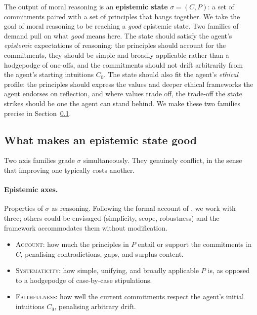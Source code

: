 \documentclass{article}
\begin{document}
The output of moral reasoning is an \textbf{epistemic state}
$\sigma = (C, P)$: a set of commitments paired with a set of principles
that hangs together. We take the goal of moral reasoning to be reaching a
\emph{good} epistemic state. Two families of demand pull on what
\emph{good} means here. The state should satisfy the agent's
\emph{epistemic} expectations of reasoning: the principles should account
for the commitments, they should be simple and broadly applicable rather
than a hodgepodge of one-offs, and the commitments should not drift
arbitrarily from the agent's starting intuitions $C_0$. The state should
also fit the agent's \emph{ethical} profile: the principles should express
the values and deeper ethical frameworks the agent endorses on reflection,
and where values trade off, the trade-off the state strikes should be one
the agent can stand behind. We make these two families precise in
Section~\ref{sec:good}.



\subsection{What makes an epistemic state good}
\label{sec:good}

Two axis families grade $\sigma$ simultaneously. They genuinely conflict, in
the sense that improving one typically costs another.

\paragraph{Epistemic axes.} Properties of $\sigma$ as reasoning. Following
the formal account of \citet{beisbart2021}, we work with three; others
could be envisaged (simplicity, scope, robustness) and the framework
accommodates them without modification.
\begin{itemize}[leftmargin=*, itemsep=2pt]
  \item \textsc{Account}: how much the principles in $P$ entail or support
    the commitments in $C$, penalising contradictions, gaps, and surplus
    content.
  \item \textsc{Systematicity}: how simple, unifying, and broadly applicable
    $P$ is, as opposed to a hodgepodge of case-by-case stipulations.
  \item \textsc{Faithfulness}: how well the current commitments respect the
    agent's initial intuitions $C_0$, penalising arbitrary drift.
\end{itemize}
\end{document}
